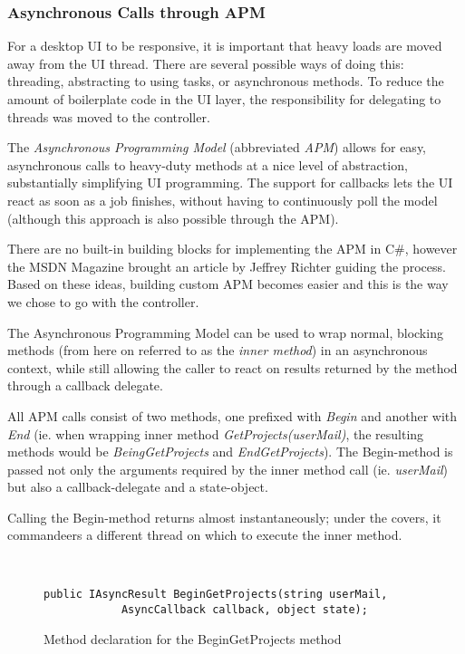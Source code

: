 \subsubsection{Asynchronous Calls through APM}
\label{sec:APM}

For a desktop UI to be responsive, it is important that heavy loads are moved away from the UI thread.
There are several possible ways of doing this: threading, abstracting to using tasks, or asynchronous
methods. To reduce the amount of boilerplate code in the UI layer, the responsibility for delegating
to threads was moved to the controller.

The \emph{Asynchronous Programming Model}\cite{msdnAPMdoc} (abbreviated \emph{APM}) allows for easy,
asynchronous calls to heavy-duty methods at a nice level of abstraction, substantially simplifying UI
programming. The support for callbacks lets the UI react as soon as a job finishes, without having to
continuously poll the model (although this approach is also possible through the APM).

There are no built-in building blocks for implementing the APM in C\#, however the MSDN Magazine\cite{richtermsdn0307}
brought an article by Jeffrey Richter guiding the process. Based on these ideas, building custom APM becomes easier and
this is the way we chose to go with the controller.

The Asynchronous Programming Model can be used to wrap normal, blocking methods (from here on referred to as
the \emph{inner method}) in an asynchronous context, while still allowing the caller to react on results
returned by the method through a callback delegate.

All APM calls consist of two methods, one prefixed with \emph{Begin} and another with \emph{End} (ie.
when wrapping inner method \emph{GetProjects(userMail)}, the resulting methods would be \emph{BeingGetProjects}
and \emph{EndGetProjects}). The Begin-method is passed not only the arguments required by the inner method call
(ie. \emph{userMail}) but also a callback-delegate and a state-object.

Calling the Begin-method returns almost instantaneously; under the covers, it commandeers a different thread
on which to execute the inner method.

\begin{figure}[hbt]
    \begin{verbatim}
    
    
public IAsyncResult BeginGetProjects(string userMail,
            AsyncCallback callback, object state);\end{verbatim}
    \caption{Method declaration for the BeginGetProjects method}
    \label{fig:begingetprojectscode}
\end{figure}

